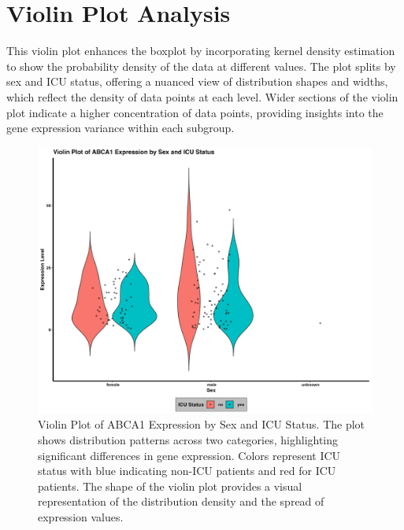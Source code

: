 \documentclass{article}
\begin{document}
\section{Violin Plot Analysis}
This violin plot enhances the boxplot by incorporating kernel density estimation to show the probability density of the data at different values. The plot splits by sex and ICU status, offering a nuanced view of distribution shapes and widths, which reflect the density of data points at each level. Wider sections of the violin plot indicate a higher concentration of data points, providing insights into the gene expression variance within each subgroup.

\begin{figure}[H]
    \centering
    \includegraphics[width=\textwidth]{Violin_ABCA1.png}
    \caption{Violin Plot of ABCA1 Expression by Sex and ICU Status. The plot shows distribution patterns across two categories, highlighting significant differences in gene expression. Colors represent ICU status with blue indicating non-ICU patients and red for ICU patients. The shape of the violin plot provides a visual representation of the distribution density and the spread of expression values.}
    \label{fig:violin_plot}
\end{figure}
\newpage


\end{document}
